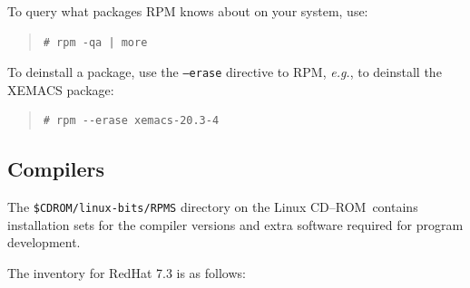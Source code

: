 \documentclass[twoside,11pt]{article}
\newcommand{\xlabel}[1]{}
\renewcommand{\_}{\texttt{\symbol{95}}}
\newcommand{\cdrom}{CD--ROM}
\newcommand{\cdrom}{CD-ROM}
\newcommand{\cdroms}{CD--ROMs}
\newcommand{\cdroms}{CD-ROMs}
\begin{document}
To query what packages RPM knows about on your system, use:

\begin{quote}
\begin{verbatim}
# rpm -qa | more
\end{verbatim}
\end{quote}

To deinstall a package, use the \texttt{--erase} directive to RPM,
\emph{e.g.}, to deinstall the XEMACS package:

\begin{quote}
\begin{verbatim}
# rpm --erase xemacs-20.3-4
\end{verbatim}
\end{quote}

%
%
%

\subsection{\label{compilers}\xlabel{compilers}Compilers}

The \texttt{\$CDROM/linux-bits/RPMS} directory on the Linux \cdrom\
contains installation sets for the compiler versions and extra software
required for program development.

The inventory for RedHat 7.3 is as follows:
\end{document}
